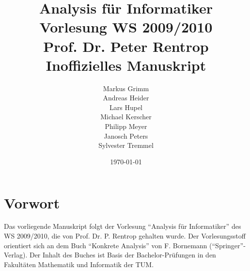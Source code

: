 


\title{Analysis für Informatiker\\\large Vorlesung WS 2009/2010\\Prof. Dr. Peter Rentrop\\Inoffizielles Manuskript}
\author{Markus Grimm\\ Andreas Heider\\ Lars Hupel\\ Michael Kerscher\\ Philipp Meyer\\Janosch Peters\\ Sylvester Tremmel}
\date{\today}



\maketitle

\newpage

{}
\chapter*{Vorwort}

 Das vorliegende Manuskript folgt der Vorlesung "`Analysis für Informatiker"' des WS 2009/2010, die von Prof. Dr. P. Rentrop gehalten wurde. Der Vorlesungsstoff orientiert sich an dem Buch "`Konkrete Analysis"' von F. Bornemann ("`Springer"'-Verlag). Der Inhalt des Buches ist Basis der Bachelor-Prüfungen in den Fakultäten Mathematik und Informatik der TUM.

\newpage

{}
\tableofcontents

\newpage
{}
{}
\listoflectures
\newpage


























\newpage
{}
{}


\newpage
{}
{}




